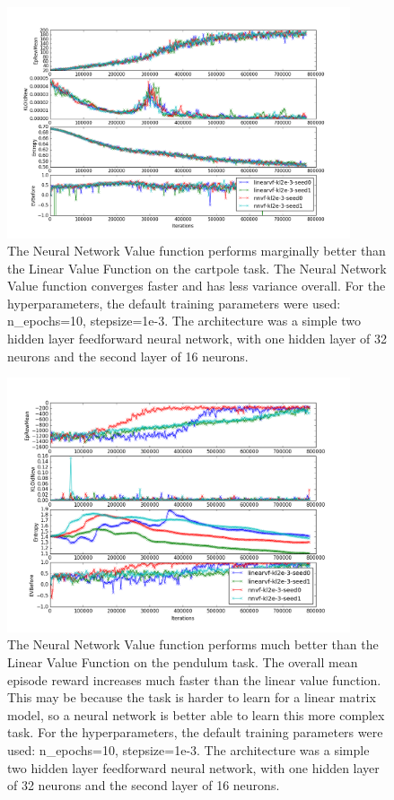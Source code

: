 \documentclass{article}%
\begin{document}
\begin{figure}[h]
    \center
		\includegraphics[width=0.9\textwidth]{nnvf_cartpole.png}
    \caption{The Neural Network Value function performs marginally better than the Linear Value Function on the cartpole task. The Neural Network Value function converges faster and has less variance overall. For the hyperparameters, the default training parameters were used: n\_epochs=10, stepsize=1e-3. The architecture was a simple two hidden layer feedforward neural network, with one hidden layer of 32 neurons and the second layer of 16 neurons.}
\end{figure}

\begin{figure}[h]
    \center
		\includegraphics[width=0.9\textwidth]{nnvf_pendulum.png}
    \caption{The Neural Network Value function performs much better than the Linear Value Function on the pendulum task. The overall mean episode reward increases much faster than the linear value function. This may be because the task is harder to learn for a linear matrix model, so a neural network is better able to learn this more complex task. For the hyperparameters, the default training parameters were used: n\_epochs=10, stepsize=1e-3. The architecture was a simple two hidden layer feedforward neural network, with one hidden layer of 32 neurons and the second layer of 16 neurons.}
\end{figure}
\end{document}
